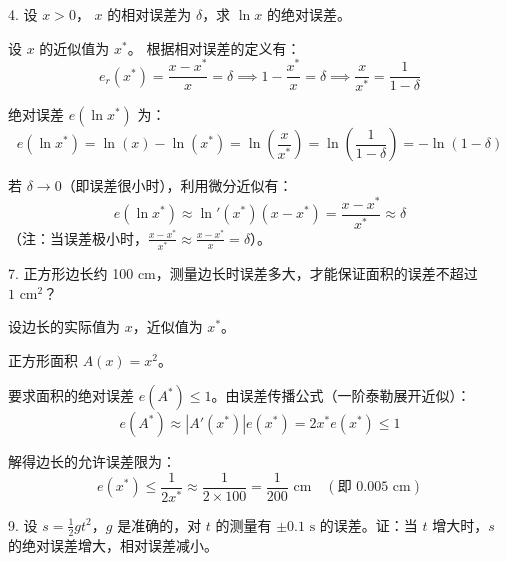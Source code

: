 \documentclass[11pt, a4paper]{ctexart} %
\begin{document}
\begin{problem}{4. 设 $x > 0$， $x$ 的相对误差为 $\delta$，求 $\ln x$ 的绝对误差。}
\end{problem}

\begin{solution}
    设 $x$ 的近似值为 $x^*$。
    根据相对误差的定义有：
    \[
        e_r(x^*) = \frac{x - x^*}{x} = \delta \implies 1 - \frac{x^*}{x} = \delta \implies \frac{x}{x^*} = \frac{1}{1-\delta}
    \]
    
    绝对误差 $e(\ln x^*)$ 为：
    \[
        e(\ln x^*) = \ln(x) - \ln(x^*) = \ln\left(\frac{x}{x^*}\right) = \ln\left(\frac{1}{1-\delta}\right) = -\ln(1-\delta)
    \]
    
    若 $\delta \to 0$（即误差很小时），利用微分近似有：
    \[
        e(\ln x^*) \approx \ln'(x^*) (x - x^*) = \frac{x - x^*}{x^*} \approx \delta
    \]
    （注：当误差极小时，$\frac{x-x^*}{x^*} \approx \frac{x-x^*}{x} = \delta$）。
\end{solution}


\begin{problem}{7. 正方形边长约 100 cm，测量边长时误差多大，才能保证面积的误差不超过 $1\text{ cm}^2$？}
\end{problem}

\begin{solution}
    设边长的实际值为 $x$，近似值为 $x^*$。
    
    正方形面积 $A(x) = x^2$。
    
    要求面积的绝对误差 $e(A^*) \le 1$。由误差传播公式（一阶泰勒展开近似）：
    \[
        e(A^*) \approx |A'(x^*)| e(x^*) = 2x^* e(x^*) \le 1
    \]
    
    解得边长的允许误差限为：
    \[
        e(x^*) \le \frac{1}{2x^*} \approx \frac{1}{2 \times 100} = \frac{1}{200} \text{ cm} \quad (\text{即 } 0.005 \text{ cm})
    \]
\end{solution}


\begin{problem}{9. 设 $s = \frac{1}{2}gt^2$，$g$ 是准确的，对 $t$ 的测量有 $\pm 0.1 \text{ s}$ 的误差。证：当 $t$ 增大时，$s$ 的绝对误差增大，相对误差减小。}
\end{problem}
\end{document}
